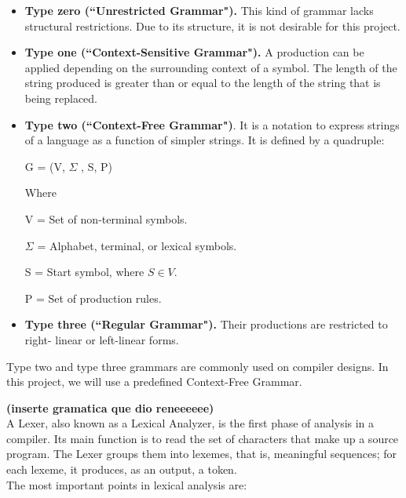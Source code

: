\documentclass[letterpaper,12pt,oneside]{article}
\begin{document}
\begin{itemize}
\item \textbf{Type zero (``Unrestricted Grammar").} This kind of grammar lacks structural restrictions. Due to its structure, it is not desirable for this project.
\item \textbf{Type one (``Context-Sensitive Grammar").} A production can be applied depending on the surrounding context of a symbol. The length of the string produced is greater than or equal to the length of the string that is being replaced.
\item \textbf{Type two (``Context-Free Grammar")}. It is a notation to express strings of a language as a function of simpler strings. It is defined by a quadruple:

\begin{center}
G = (V, \(\Sigma\) , S, P)
\end{center}
Where

V = Set of non-terminal symbols.

 \(\Sigma\) = Alphabet, terminal, or lexical symbols.

S = Start symbol, where $S \in V$.

P = Set of production rules.  \cite{unam_glc}

\item \textbf{Type three (``Regular Grammar").} Their productions are restricted to right- linear or left-linear forms.

\end{itemize}

Type two and type three grammars are commonly used on compiler designs. In this project, we will use a predefined Context-Free Grammar.

\textbf{(inserte gramatica que dio reneeeeee)}\\

A Lexer, also known as a Lexical Analyzer, is the first phase of analysis in a compiler. Its main function is to read the set of characters that make up a source program. The Lexer groups them into lexemes, that is, meaningful sequences; for each lexeme, it produces, as an output, a token.\\

The most important points in lexical analysis are:
\end{document}
